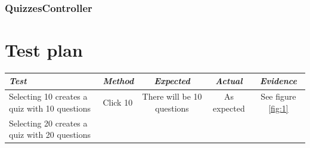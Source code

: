 \documentclass[english,a4paper,]{report}
\begin{document}
\subsection{QuizzesController}\label{quizzescontroller}

\chapter{Test plan}\label{test-plan}

\begin{longtable}[]{@{}llccc@{}}
\toprule
\begin{minipage}[b]{0.16\columnwidth}\raggedright\strut
\emph{Test}\strut
\end{minipage} & \begin{minipage}[b]{0.15\columnwidth}\raggedright\strut
\emph{Method}\strut
\end{minipage} & \begin{minipage}[b]{0.19\columnwidth}\centering\strut
\emph{Expected}\strut
\end{minipage} & \begin{minipage}[b]{0.17\columnwidth}\centering\strut
\emph{Actual}\strut
\end{minipage} & \begin{minipage}[b]{0.18\columnwidth}\centering\strut
\emph{Evidence}\strut
\end{minipage}\tabularnewline
\midrule
\endhead
\begin{minipage}[t]{0.16\columnwidth}\raggedright\strut
Selecting 10 creates a quiz with 10 questions\strut
\end{minipage} & \begin{minipage}[t]{0.15\columnwidth}\raggedright\strut
Click 10\strut
\end{minipage} & \begin{minipage}[t]{0.19\columnwidth}\centering\strut
There will be 10 questions\strut
\end{minipage} & \begin{minipage}[t]{0.17\columnwidth}\centering\strut
As expected\strut
\end{minipage} & \begin{minipage}[t]{0.18\columnwidth}\centering\strut
See figure \ref{fig:1}\strut
\end{minipage}\tabularnewline
\begin{minipage}[t]{0.16\columnwidth}\raggedright\strut
Selecting 20 creates a quiz with 20 questions\strut
\end{minipage} & \begin{minipage}[t]{0.15\columnwidth}\raggedright\strut

\end{minipage}
\end{longtable}
\end{document}
